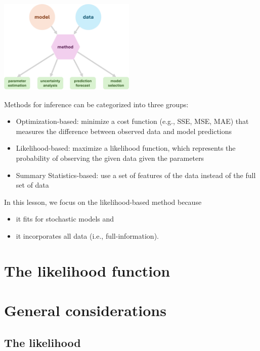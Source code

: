 \documentclass[
  letterpaper,
  DIV=11,
  numbers=noendperiod]{scrartcl}
\providecommand{\tightlist}{%
  \setlength{\itemsep}{0pt}\setlength{\parskip}{0pt}}\usepackage{longtable,booktabs,array}
\begin{document}
\begin{center}
  \includegraphics[height=4.5cm]{../graphics/lec3_overview}
\end{center}

\framebreak

Methods for inference can be categorized into three groups:

\begin{itemize}
\tightlist
\item
  Optimization-based: minimize a cost function (e.g., SSE, MSE, MAE)
  that measures the difference between observed data and model
  predictions
\item
  Likelihood-based: maximize a likelihood function, which represents the
  probability of observing the given data given the parameters
\item
  Summary Statistics-based: use a set of features of the data instead of
  the full set of data
\end{itemize}

In this lesson, we focus on the likelihood-based method because

\begin{itemize}
\tightlist
\item
  it fits for stochastic models and
\item
  it incorporates all data (i.e., full-information).
\end{itemize}

\hypertarget{the-likelihood-function}{%
\section{The likelihood function}\label{the-likelihood-function}}

\hypertarget{general-considerations}{%
\section{General considerations}\label{general-considerations}}

\hypertarget{the-likelihood}{%
\subsection{The likelihood}\label{the-likelihood}}
\end{document}
